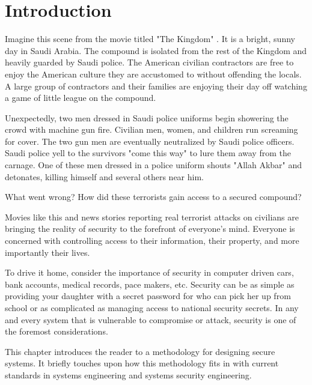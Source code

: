 \documentclass[../../main/main.tex]{subfiles}
\begin{document}
\glsresetall

\chapter{Introduction}
 Imagine this scene from the movie titled "The Kingdom" \cite{kingdom}.  It is a bright, sunny day in Saudi Arabia.  The compound is isolated from the rest of the Kingdom and heavily guarded by Saudi police.  The American civilian contractors are free to enjoy the American culture they are accustomed to without offending the locals.  A large group of contractors and their families are enjoying their day off watching a game of little league on the compound.  
 
 
Unexpectedly, two men dressed in Saudi police uniforms begin showering the crowd with machine gun fire.   Civilian men, women, and children run screaming for cover. The two gun men are eventually neutralized by Saudi police officers.  Saudi police yell to the survivors "come this way" to lure them away from the carnage. One of these men dressed in a police uniform shouts "Allah Akbar" and detonates, killing himself and several others near him. 

What went wrong?  How did these terrorists gain access to a secured compound?  

Movies like this and news stories reporting real terrorist attacks on civilians are bringing the reality of security to the forefront of everyone's mind.   Everyone is concerned with controlling access to their information, their property, and more importantly their lives.   

To drive it home, consider the importance of security in computer driven cars, bank accounts, medical records, pace makers, etc.  Security can be as simple as providing your daughter with a secret password for who can pick her up from school or as complicated as managing access to national security secrets.  In any and every system that is vulnerable to compromise or attack, security is one of the foremost considerations. 


This chapter introduces the reader to a methodology for designing secure systems.  It briefly touches upon how this methodology fits in with current standards in systems engineering and systems security engineering. 

\end{document}
